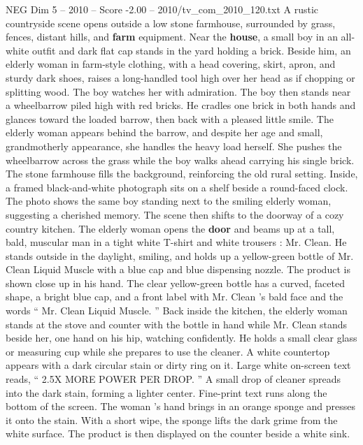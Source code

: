 \begin{textsample}{NEG Dim 5 – 2010 – Score -2.00 – 2010/tv\_com\_2010\_120.txt}  \label{ex:f5_neg_060}
A rustic countryside scene opens outside a low stone farmhouse, surrounded by grass, fences, distant hills, and \textbf{farm} equipment.
Near the \textbf{house}, a small boy in an all-white outfit and dark flat cap stands in the yard holding a brick.
Beside him, an elderly woman in farm-style clothing, with a head covering, skirt, apron, and sturdy dark shoes, raises a long-handled tool high over her head as if chopping or splitting wood.
The boy watches her with admiration.
The boy then stands near a wheelbarrow piled high with red bricks.
He cradles one brick in both hands and glances toward the loaded barrow, then back with a pleased little smile.
The elderly woman appears behind the barrow, and despite her age and small, grandmotherly appearance, she handles the heavy load herself.
She pushes the wheelbarrow across the grass while the boy walks ahead carrying his single brick.
The stone farmhouse fills the background, reinforcing the old rural setting.
Inside, a framed black-and-white photograph sits on a shelf beside a round-faced clock.
The photo shows the same boy standing next to the smiling elderly woman, suggesting a cherished memory.
The scene then shifts to the doorway of a cozy country kitchen.
The elderly woman opens the \textbf{door} and beams up at a tall, bald, muscular man in a tight white T-shirt and white trousers : Mr.
Clean.
He stands outside in the daylight, smiling, and holds up a yellow-green bottle of Mr.
Clean Liquid Muscle with a blue cap and blue dispensing nozzle.
The product is shown close up in his hand.
The clear yellow-green bottle has a curved, faceted shape, a bright blue cap, and a front label with Mr.
Clean ’s bald face and the words “ Mr.
Clean Liquid Muscle. ” Back inside the kitchen, the elderly woman stands at the stove and counter with the bottle in hand while Mr.
Clean stands beside her, one hand on his hip, watching confidently.
He holds a small clear glass or measuring cup while she prepares to use the cleaner.
A white countertop appears with a dark circular stain or dirty ring on it.
Large white on-screen text reads, “ 2.5X MORE POWER PER DROP. ” A small drop of cleaner spreads into the dark stain, forming a lighter center.
Fine-print text runs along the bottom of the screen.
The woman ’s hand brings in an orange sponge and presses it onto the stain.
With a short wipe, the sponge lifts the dark grime from the white surface.
The product is then displayed on the counter beside a white sink.

\end{textsample}

